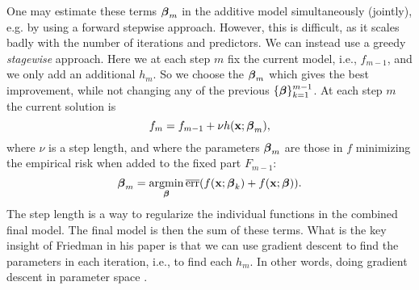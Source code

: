 One may estimate these terms $\boldsymbol{\beta}_m$ in the additive model simultaneously (jointly), e.g. by using a forward stepwise approach.
However, this is difficult, as it scales badly with the number of iterations and predictors. We can instead use a greedy \textit{stagewise} approach. Here we at each step $m$ fix the current model, i.e., $f_{m-1}$, and we only add an additional $h_m$. So we choose the $\boldsymbol{\beta}_m$ which gives the best improvement, while not changing any of the previous $\{\boldsymbol{\beta}\}_{k=1}^{m-1}$. At each step $m$ the current solution is
\begin{equation*}
    f_{m}=f_{m-1}+\nu h(\mathbf{x};\boldsymbol{\beta}_m),
\end{equation*}
where $\nu$ is a step length, and where the parameters $\boldsymbol{\beta}_m$ are those in $f$ minimizing the empirical risk when added to the fixed part $F_{m-1}$:
\begin{equation*}
    \boldsymbol{\beta}_m=\operatorname*{argmin}_{\boldsymbol{\beta}}\overline{\text{err}}(f(\mathbf{x};\boldsymbol{\beta}_k)+f(\mathbf{x};\boldsymbol{\beta})).
\end{equation*}
The step length is a way to regularize the individual functions in the combined final model. The final model is then the sum of these terms. What is the key insight of Friedman in his paper is that we can use gradient descent to find the parameters in each iteration, i.e., to find each $h_m$. In other words, doing gradient descent in parameter space \citep{friedman2001}.

